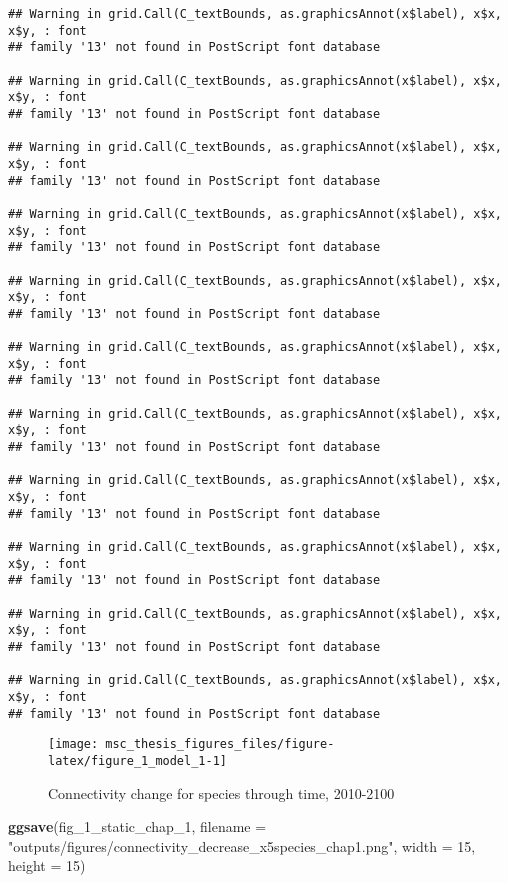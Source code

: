 \documentclass[
]{article}
\newenvironment{Shaded}{\begin{snugshade}}{\end{snugshade}}
\newcommand{\DataTypeTok}[1]{\textcolor[rgb]{0.13,0.29,0.53}{#1}}
\newcommand{\DecValTok}[1]{\textcolor[rgb]{0.00,0.00,0.81}{#1}}
\newcommand{\KeywordTok}[1]{\textcolor[rgb]{0.13,0.29,0.53}{\textbf{#1}}}
\newcommand{\NormalTok}[1]{#1}
\newcommand{\StringTok}[1]{\textcolor[rgb]{0.31,0.60,0.02}{#1}}
\begin{document}
\begin{verbatim}
## Warning in grid.Call(C_textBounds, as.graphicsAnnot(x$label), x$x, x$y, : font
## family '13' not found in PostScript font database

## Warning in grid.Call(C_textBounds, as.graphicsAnnot(x$label), x$x, x$y, : font
## family '13' not found in PostScript font database

## Warning in grid.Call(C_textBounds, as.graphicsAnnot(x$label), x$x, x$y, : font
## family '13' not found in PostScript font database

## Warning in grid.Call(C_textBounds, as.graphicsAnnot(x$label), x$x, x$y, : font
## family '13' not found in PostScript font database

## Warning in grid.Call(C_textBounds, as.graphicsAnnot(x$label), x$x, x$y, : font
## family '13' not found in PostScript font database

## Warning in grid.Call(C_textBounds, as.graphicsAnnot(x$label), x$x, x$y, : font
## family '13' not found in PostScript font database

## Warning in grid.Call(C_textBounds, as.graphicsAnnot(x$label), x$x, x$y, : font
## family '13' not found in PostScript font database

## Warning in grid.Call(C_textBounds, as.graphicsAnnot(x$label), x$x, x$y, : font
## family '13' not found in PostScript font database

## Warning in grid.Call(C_textBounds, as.graphicsAnnot(x$label), x$x, x$y, : font
## family '13' not found in PostScript font database

## Warning in grid.Call(C_textBounds, as.graphicsAnnot(x$label), x$x, x$y, : font
## family '13' not found in PostScript font database

## Warning in grid.Call(C_textBounds, as.graphicsAnnot(x$label), x$x, x$y, : font
## family '13' not found in PostScript font database
\end{verbatim}

\begin{figure}
\texttt{[image: msc\_thesis\_figures\_files/figure-latex/figure\_1\_model\_1-1]} \caption{Connectivity change for species through time, 2010-2100}\label{fig:figure_1_model_1}
\end{figure}

\begin{Shaded}
\begin{Highlighting}[]
\KeywordTok{ggsave}\NormalTok{(fig_}\DecValTok{1}\NormalTok{_static_chap_}\DecValTok{1}\NormalTok{, }
       \DataTypeTok{filename =} \StringTok{"outputs/figures/connectivity_decrease_x5species_chap1.png"}\NormalTok{, }
       \DataTypeTok{width =} \DecValTok{15}\NormalTok{, }\DataTypeTok{height =} \DecValTok{15}\NormalTok{)}
\end{Highlighting}
\end{Shaded}
\end{document}
